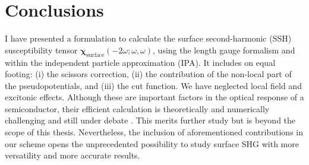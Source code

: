\section{Conclusions}

I have presented a formulation to calculate the surface second-harmonic (SSH)
susceptibility tensor
$\boldsymbol{\chi}_{\mathrm{surface}}(-2\omega;\omega,\omega)$, using the length
gauge formalism and within the independent particle approximation (IPA). It
includes on equal footing: (i) the scissors correction, (ii) the contribution of
the non-local part of the pseudopotentials, and (iii) the cut function. We have
neglected local field and excitonic effects. Although these are important
factors in the optical response of a semiconductor, their efficient calculation
is theoretically and numerically challenging and still under debate
\cite{beyond}. This merits further study but is beyond the scope of this thesis.
Nevertheless, the inclusion of aforementioned contributions in our scheme opens
the unprecedented possibility to study surface SHG with more versatility and
more accurate results.


\stopcontents[chapters]

